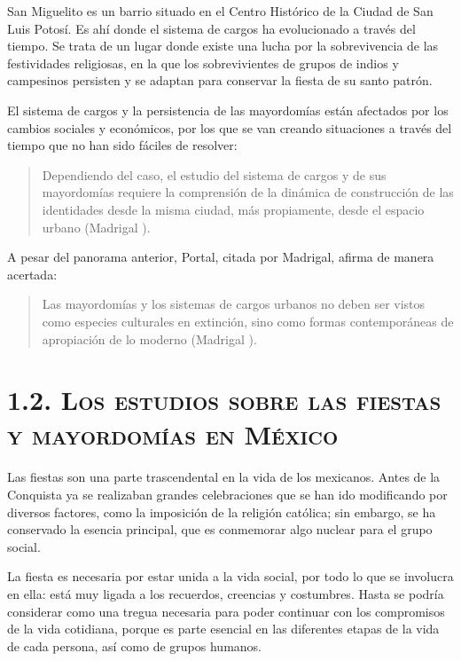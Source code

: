 \documentclass[14pt,letterpaper,twoside]{extbook} %
\begin{document}
\noindent San Miguelito es un barrio situado en el Centro Histórico de la Ciudad de San Luis Potosí. Es ahí donde el sistema de cargos ha evolucionado a través del tiempo. Se trata de un lugar donde existe una lucha por la sobrevivencia de las festividades religiosas, en la que los sobrevivientes de grupos de indios y campesinos persisten y se adaptan para conservar la fiesta de su santo patrón.

El sistema de cargos y la persistencia de las mayordomías están afectados por los cambios sociales y económicos, por los que se van creando situaciones a través del tiempo que no han sido fáciles de resolver:

\begin{quotation}
\noindent Dependiendo del caso, el estudio del sistema de cargos y de sus mayordomías requiere la comprensión de la dinámica de construcción de las identidades desde la misma ciudad, más propiamente, desde el espacio urbano (Madrigal ).
\end{quotation}

\noindent A pesar del panorama anterior, Portal, citada por Madrigal, afirma de manera acertada:

\begin{quotation}
\noindent Las mayordomías y los sistemas de cargos urbanos no deben ser vistos como especies culturales en extinción, sino como formas contemporáneas de apropiación de lo moderno (Madrigal ).
\end{quotation}

\section*{\mdseries\large\textsc{1.2. Los estudios sobre las fiestas y mayordomías en México}}

\noindent Las fiestas son una parte trascendental en la vida de los mexicanos. Antes de la Conquista ya se realizaban grandes celebraciones que se han ido modificando por diversos factores, como la imposición de la religión católica; sin embargo, se ha conservado la esencia principal, que es conmemorar algo nuclear para el grupo social.

La fiesta es necesaria por estar unida a la vida social, por todo lo que se involucra en ella: está muy ligada a los recuerdos, creencias y costumbres. Hasta se podría considerar como una tregua necesaria para poder continuar con los compromisos de la vida cotidiana, porque es parte esencial en las diferentes etapas de la vida de cada persona, así como de grupos humanos.
\end{document}
